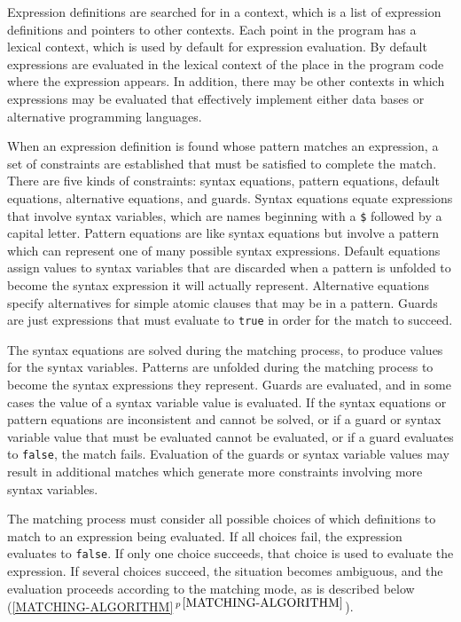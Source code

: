 \documentclass[12pt]{article}
\newcommand{\secref}[1]{\ref{#1}$\,^{p\,\pageref{#1}}$}
\begin{document}
Expression definitions are searched for in a context, which is a list
of expression definitions and pointers to other contexts.
Each point in the program has a lexical context, which is used by default
for expression evaluation. 
By default expressions are evaluated in the
lexical context of the place in the program code where the expression
appears.  In addition, there may be other
contexts in which expressions may be evaluated that effectively implement
either data bases or alternative programming languages.

When an expression definition is found whose pattern matches an expression,
a set of constraints are established that must be satisfied to
complete the match.  There are five kinds of constraints: syntax
equations, pattern equations, default equations, alternative
equations, and guards.
Syntax equations equate expressions that involve syntax variables,
which are names beginning with a \verb|$| followed by a capital letter.
Pattern equations are like syntax equations but
involve a pattern which can represent one of many possible syntax
expressions.  Default equations assign values to syntax variables that are
discarded when a pattern is unfolded to become the syntax expression
it will actually represent.  Alternative equations specify alternatives
for simple atomic clauses that may be in a pattern.
Guards are just expressions that must evaluate to
\verb|true| in order for the match to succeed.

The syntax equations are solved during the matching process,
to produce values for the syntax variables.  Patterns are unfolded during
the matching process to become the syntax expressions they represent.
Guards are evaluated, and in some cases the value of a syntax variable
value is evaluated.
If the syntax equations or pattern equations are inconsistent and
cannot be solved, or if a guard or syntax variable value that must be
evaluated cannot be evaluated, or if a guard evaluates to \verb|false|,
the match fails.  Evaluation of the guards or syntax variable values
may result in additional matches which generate more
constraints involving more syntax variables.

The matching process must consider all possible choices of which definitions
to match to an expression being evaluated.  If all choices fail, the
expression evaluates to \verb|false|.  If only one choice succeeds, that
choice is used to evaluate the expression.  If several choices succeed,
the situation becomes ambiguous, and the evaluation proceeds according
to the matching mode, as is described below
(\secref{MATCHING-ALGORITHM}).
\end{document}

